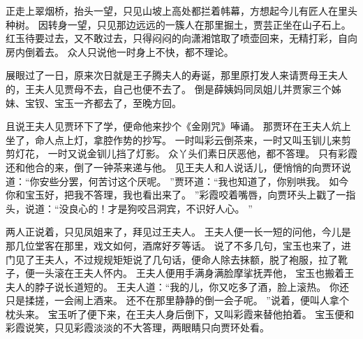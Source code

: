 正走上翠烟桥，抬头一望，只见山坡上高处都拦着帏幕，方想起今儿有匠人在里头种树。
因转身一望，只见那边远远的一簇人在那里掘土，贾芸正坐在山子石上。
红玉待要过去，又不敢过去，只得闷闷的向潇湘馆取了喷壶回来，无精打彩，自向房内倒着去。
众人只说他一时身上不快，都不理论。
\par
展眼过了一日，原来次日就是王子腾夫人的寿诞，那里原打发人来请贾母王夫人的，王夫人见贾母不去，自己也便不去了。
倒是薛姨妈同凤姐儿并贾家三个姊妹、宝钗、宝玉一齐都去了，至晚方回。
\par
且说王夫人见贾环下了学，便命他来抄个《金刚咒》唪诵。
那贾环在王夫人炕上坐了，命人点上灯，拿腔作势的抄写。
一时叫彩云倒茶来，一时又叫玉钏儿来剪剪灯花，
一时又说金钏儿挡了灯影。
众丫头们素日厌恶他，都不答理。
只有彩霞还和他合的来，倒了一钟茶来递与他。
见王夫人和人说话儿，便悄悄的向贾环说道：“你安些分罢，何苦讨这个厌呢。
”贾环道：“我也知道了，你别哄我。
如今你和宝玉好，把我不答理，我也看出来了。
”彩霞咬着嘴唇，向贾环头上戳了一指头，说道：“没良心的！才是狗咬吕洞宾，不识好人心。
”\par
两人正说着，只见凤姐来了，拜见过王夫人。
王夫人便一长一短的问他，今儿是那几位堂客在那里，戏文如何，酒席好歹等话。
说了不多几句，宝玉也来了，进门见了王夫人，不过规规矩矩说了几句话，便命人除去抹额，脱了袍服，拉了靴子，便一头滚在王夫人怀内。
王夫人便用手满身满脸摩挲抚弄他， 
宝玉也搬着王夫人的脖子说长道短的。
王夫人道：“我的儿，你又吃多了酒，脸上滚热。
你还只是揉搓，一会闹上酒来。
还不在那里静静的倒一会子呢。
”说着，便叫人拿个枕头来。
宝玉听了便下来，在王夫人身后倒下，又叫彩霞来替他拍着。
宝玉便和彩霞说笑，只见彩霞淡淡的不大答理，两眼睛只向贾环处看。
